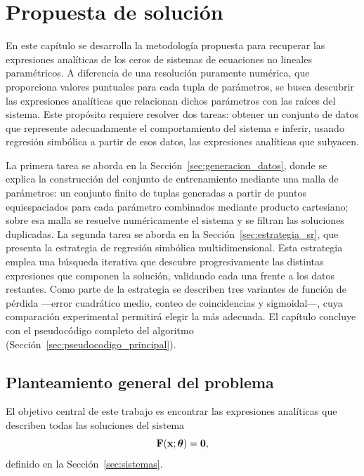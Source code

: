 \chapter{Propuesta de solución}
\label{sec:propuesta}

En este capítulo se desarrolla la metodología propuesta para recuperar las expresiones analíticas de los ceros de sistemas de ecuaciones no lineales paramétricos. A diferencia de una resolución puramente numérica, que proporciona valores puntuales para cada tupla de parámetros, se busca descubrir las expresiones analíticas que relacionan dichos parámetros con las raíces del sistema. Este propósito requiere resolver dos tareas: obtener un conjunto de datos que represente adecuadamente el comportamiento del sistema e inferir, usando regresión simbólica a partir de esos datos, las expresiones analíticas que subyacen.

La primera tarea se aborda en la Sección~\ref{sec:generacion_datos}, donde se explica la construcción del conjunto de entrenamiento mediante una malla de parámetros: un conjunto finito de tuplas generadas a partir de puntos equiespaciados para cada parámetro combinados mediante producto cartesiano; sobre esa malla se resuelve numéricamente el sistema y se filtran las soluciones duplicadas. La segunda tarea se aborda en la Sección~\ref{sec:estrategia_sr}, que presenta la estrategia de regresión simbólica multidimensional. Esta estrategia emplea una búsqueda iterativa que descubre progresivamente las distintas expresiones que componen la solución, validando cada una frente a los datos restantes. Como parte de la estrategia se describen tres variantes de función de pérdida —error cuadrático medio, conteo de coincidencias y sigmoidal—, cuya comparación experimental permitirá elegir la más adecuada. El capítulo concluye con el pseudocódigo completo del algoritmo (Sección~\ref{sec:pseudocodigo_principal}).

\section{Planteamiento general del problema}
\label{sec:planteamiento}

El objetivo central de este trabajo es encontrar las expresiones analíticas que describen todas las soluciones del sistema
\begin{equation}
\mathbf{F}(\mathbf{x}; \boldsymbol{\theta}) = \mathbf{0}, \label{eq:problema_original}
\end{equation}
definido en la Sección~\ref{sec:sistemas}.

